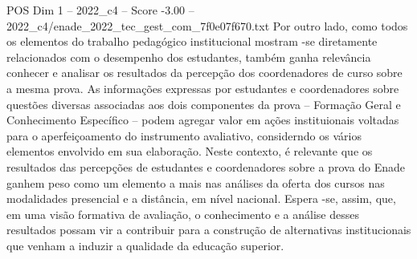 \begin{textsample}{POS Dim 1 – 2022\_c4 – Score -3.00 – 2022\_c4/enade\_2022\_tec\_gest\_com\_7f0e07f670.txt}
Por outro lado, como todos os elementos do trabalho pedagógico institucional mostram -se diretamente relacionados com o desempenho dos estudantes, também ganha relevância conhecer e analisar os resultados da percepção dos coordenadores de curso sobre a mesma prova.
As informações expressas por estudantes e coordenadores sobre questões diversas associadas aos dois componentes da prova – Formação Geral e Conhecimento Específico – podem agregar valor em ações instituionais voltadas para o aperfeiçoamento do instrumento avaliativo, considerndo os vários elementos envolvido em sua elaboração.
Neste contexto, é relevante que os resultados das percepções de estudantes e coordenadores sobre a prova do Enade ganhem peso como um elemento a mais nas análises da oferta dos cursos nas modalidades presencial e a distância, em nível nacional.
Espera -se, assim, que, em uma visão formativa de avaliação, o conhecimento e a análise desses resultados possam vir a contribuir para a construção de alternativas institucionais que venham a induzir a qualidade da educação superior.

\end{textsample}
